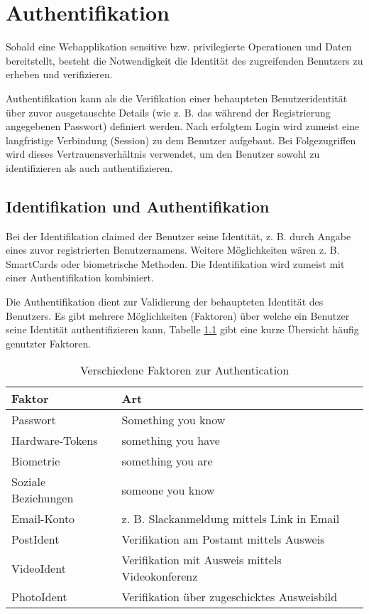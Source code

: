 \chapter{Authentifikation}

Sobald eine Webapplikation sensitive bzw. privilegierte Operationen und Daten bereitstellt, besteht die Notwendigkeit die Identität des zugreifenden Benutzers zu erheben und verifizieren.

Authentifikation kann als die Verifikation einer behaupteten Benutzeridentität über zuvor ausgetauschte Details (wie z. B. das während der Registrierung angegebenen Passwort) definiert werden. Nach erfolgtem Login wird zumeist eine langfristige Verbindung (Session) zu dem Benutzer aufgebaut. Bei Folgezugriffen wird dieses Vertrauensverhältnis verwendet, um den Benutzer sowohl zu identifizieren als auch authentifizieren.

\section{Identifikation und Authentifikation}

Bei der Identifikation claimed der Benutzer seine Identität, z. B. durch Angabe eines zuvor registrierten Benutzernamens. Weitere Möglichkeiten wären z. B. SmartCards oder biometrische Methoden. Die Identifikation wird zumeist mit einer Authentifikation kombiniert.

Die Authentifikation dient zur Validierung der behaupteten Identität des Benutzers. Es gibt mehrere Möglichkeiten (Faktoren) über welche ein Benutzer seine Identität authentifizieren kann, Tabelle \ref{tbl:factors} gibt eine kurze Übersicht häufig genutzter Faktoren.

\begin{table}[h!]
	\begin{center}
\begin{tabular}{lp{7cm}}
	\toprule
	Faktor & Art\\
	\midrule
	Passwort & Something you know \\
	Hardware-Tokens & something you have \\
	Biometrie & something you are \\
	Soziale Beziehungen & someone you know \\
	Email-Konto & z. B. Slackanmeldung mittels Link in Email \\
	PostIdent & Verifikation am Postamt mittels Ausweis \\
	VideoIdent & Verifikation mit Ausweis mittels Videokonferenz \\
	PhotoIdent & Verifikation über zugeschicktes Ausweisbild \\
	\bottomrule
\end{tabular}
	\caption{Verschiedene Faktoren zur Authentication}
	\label{tbl:factors}
\end{center}
\end{table}

